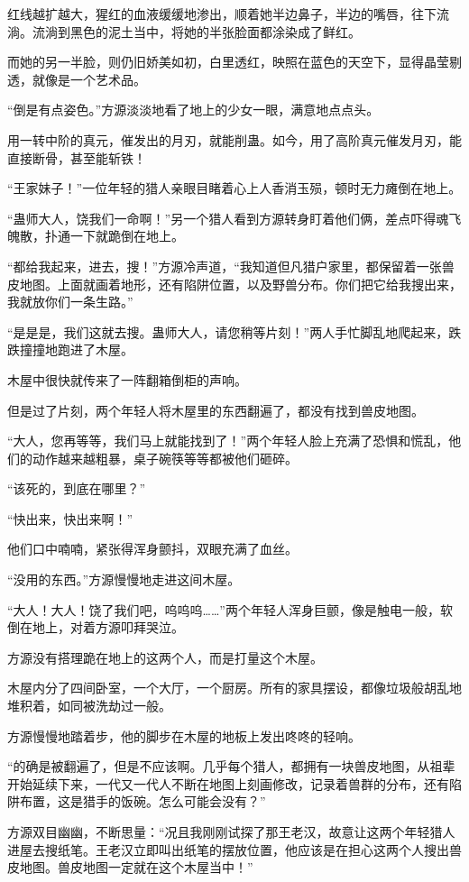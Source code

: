 \begin{this_body}
红线越扩越大，猩红的血液缓缓地渗出，顺着她半边鼻子，半边的嘴唇，往下流淌。流淌到黑色的泥土当中，将她的半张脸面都涂染成了鲜红。

而她的另一半脸，则仍旧娇美如初，白里透红，映照在蓝色的天空下，显得晶莹剔透，就像是一个艺术品。

“倒是有点姿色。”方源淡淡地看了地上的少女一眼，满意地点点头。

用一转中阶的真元，催发出的月刃，就能削蛊。如今，用了高阶真元催发月刃，能直接断骨，甚至能斩铁！

“王家妹子！”一位年轻的猎人亲眼目睹着心上人香消玉殒，顿时无力瘫倒在地上。

“蛊师大人，饶我们一命啊！”另一个猎人看到方源转身盯着他们俩，差点吓得魂飞魄散，扑通一下就跪倒在地上。

“都给我起来，进去，搜！”方源冷声道，“我知道但凡猎户家里，都保留着一张兽皮地图。上面就画着地形，还有陷阱位置，以及野兽分布。你们把它给我搜出来，我就放你们一条生路。”

“是是是，我们这就去搜。蛊师大人，请您稍等片刻！”两人手忙脚乱地爬起来，跌跌撞撞地跑进了木屋。

木屋中很快就传来了一阵翻箱倒柜的声响。

但是过了片刻，两个年轻人将木屋里的东西翻遍了，都没有找到兽皮地图。

“大人，您再等等，我们马上就能找到了！”两个年轻人脸上充满了恐惧和慌乱，他们的动作越来越粗暴，桌子碗筷等等都被他们砸碎。

“该死的，到底在哪里？”

“快出来，快出来啊！”

他们口中喃喃，紧张得浑身颤抖，双眼充满了血丝。

“没用的东西。”方源慢慢地走进这间木屋。

“大人！大人！饶了我们吧，呜呜呜……”两个年轻人浑身巨颤，像是触电一般，软倒在地上，对着方源叩拜哭泣。

方源没有搭理跪在地上的这两个人，而是打量这个木屋。

木屋内分了四间卧室，一个大厅，一个厨房。所有的家具摆设，都像垃圾般胡乱地堆积着，如同被洗劫过一般。

方源慢慢地踏着步，他的脚步在木屋的地板上发出咚咚的轻响。

“的确是被翻遍了，但是不应该啊。几乎每个猎人，都拥有一块兽皮地图，从祖辈开始延续下来，一代又一代人不断在地图上刻画修改，记录着兽群的分布，还有陷阱布置，这是猎手的饭碗。怎么可能会没有？”

方源双目幽幽，不断思量：“况且我刚刚试探了那王老汉，故意让这两个年轻猎人进屋去搜纸笔。王老汉立即叫出纸笔的摆放位置，他应该是在担心这两个人搜出兽皮地图。兽皮地图一定就在这个木屋当中！”


\end{this_body}
